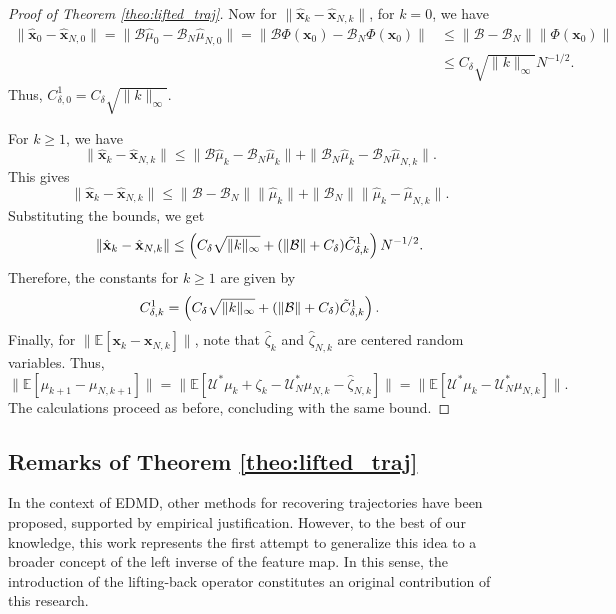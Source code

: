 \documentclass{article}
\newcommand{\U}{\mathcal{U}}
\newcommand{\B}{\mathcal{B}}
\begin{document}
\begin{proof}[Proof of Theorem \ref{theo:lifted_traj}]
    Now for \( \| \hat{\mathbf{x}}_k - \hat{\mathbf{x}}_{N,k} \| \), for \( k = 0 \), we have
    \[
    \begin{aligned}
        \| \hat{\mathbf{x}}_0 - \hat{\mathbf{x}}_{N,0} \| = \| \B \hat{\mu}_0 - \B_N \hat{\mu}_{N,0} \| = \| \B \Phi(\mathbf{x}_0) - \B_N \Phi(\mathbf{x}_0) \|
    & \leq \| \B - \B_N \| \| \Phi(\mathbf{x}_0) \| \\ & \leq C_\delta \sqrt{\| k \|_\infty} N^{-1/2}.
    \end{aligned}
    \]
    Thus, \( C_{\delta,0}^1 = C_\delta \sqrt{\| k \|_\infty} \).

    For \( k \geq 1 \), we have
    \[
    \| \hat{\mathbf{x}}_k - \hat{\mathbf{x}}_{N,k} \|
    \leq \| \B \hat{\mu}_k - \B_N \hat{\mu}_k \| + \| \B_N \hat{\mu}_k - \B_N \hat{\mu}_{N,k} \|.
    \]
    This gives
    \[
    \| \hat{\mathbf{x}}_k - \hat{\mathbf{x}}_{N,k} \|
    \leq \| \B - \B_N \| \| \hat{\mu}_k \| + \| \B_N \| \| \hat{\mu}_k - \hat{\mu}_{N,k} \|.
    \]
    Substituting the bounds, we get
    \[
    \| \hat{\mathbf{x}}_k - \hat{\mathbf{x}}_{N,k} \|
    \leq \left( C_\delta \sqrt{\| k \|_\infty} + (\| \B \| + C_\delta) \Tilde{C}_{\delta,k}^1 \right) N^{-1/2}.
    \]
    Therefore, the constants for \( k \geq 1 \) are given by
    \[
    C_{\delta,k}^1 = \left( C_\delta \sqrt{\| k \|_\infty} + (\| \B \| + C_\delta) \Tilde{C}_{\delta,k}^1 \right).
    \]
    Finally, for \( \| \mathbb{E}[ \mathbf{x}_k - \mathbf{x}_{N,k} ] \| \), note that \( \hat{\zeta}_k \) and \( \hat{\zeta}_{N,k} \) are centered random variables. Thus,
    \[
    \| \mathbb{E}[ \mu_{k+1} - \mu_{N,k+1} ] \| = \| \mathbb{E}[ \U^* \mu_k + \zeta_k - \U_N^* \mu_{N,k} - \hat{\zeta}_{N,k} ] \| = \| \mathbb{E}[ \U^* \mu_k - \U_N^* \mu_{N,k}] \|.
    \]
    The calculations proceed as before, concluding with the same bound.
\end{proof}

\subsection{Remarks of Theorem \ref{theo:lifted_traj}}

In the context of EDMD, other methods for recovering trajectories have been proposed, supported by empirical justification. However, to the best of our knowledge, this work represents the first attempt to generalize this idea to a broader concept of the left inverse of the feature map. In this sense, the introduction of the lifting-back operator constitutes an original contribution of this research.
\end{document}
